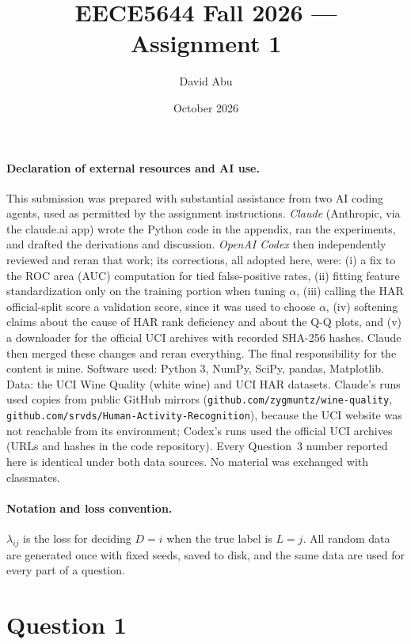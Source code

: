\documentclass[10pt]{article}
\title{EECE5644 Fall 2026 --- Assignment 1}
\author{David Abu}
\date{October 2026}
\begin{document}
\maketitle

\paragraph{Declaration of external resources and AI use.}
This submission was prepared with substantial assistance from two AI coding agents, used as permitted by the assignment instructions. \emph{Claude} (Anthropic, via the claude.ai app) wrote the Python code in the appendix, ran the experiments, and drafted the derivations and discussion. \emph{OpenAI Codex} then independently reviewed and reran that work; its corrections, all adopted here, were: (i) a fix to the ROC area (AUC) computation for tied false-positive rates, (ii) fitting feature standardization only on the training portion when tuning $\alpha$, (iii) calling the HAR official-split score a validation score, since it was used to choose $\alpha$, (iv) softening claims about the cause of HAR rank deficiency and about the Q-Q plots, and (v) a downloader for the official UCI archives with recorded SHA-256 hashes. Claude then merged these changes and reran everything. The final responsibility for the content is mine. Software used: Python 3, NumPy, SciPy, pandas, Matplotlib. Data: the UCI Wine Quality (white wine) and UCI HAR datasets. Claude's runs used copies from public GitHub mirrors (\texttt{github.com/zygmuntz/wine-quality}, \texttt{github.com/srvds/Human-Activity-Recognition}), because the UCI website was not reachable from its environment; Codex's runs used the official UCI archives (URLs and hashes in the code repository). Every Question~3 number reported here is identical under both data sources. No material was exchanged with classmates.

\paragraph{Notation and loss convention.} $\lambda_{ij}$ is the loss for deciding $D=i$ when the true label is $L=j$. All random data are generated once with fixed seeds, saved to disk, and the same data are used for every part of a question.

\section*{Question 1}
\end{document}
